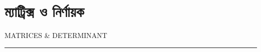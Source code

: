 \documentclass[a4paper,12pt,twoside]{book}
\begin{document}
	\chapter{ম্যাট্রিক্স ও নির্ণায়ক}
	{\Large MATRICES \& DETERMINANT} \\
	\rule{\textwidth}{2pt}
	
\end{document}
